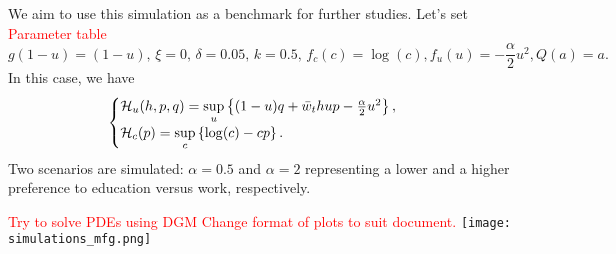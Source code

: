         We aim to use this simulation as a benchmark for further studies.        
        Let's set \textcolor{red}{Parameter table}
        $$g(1- u) = (1 - u),\,\xi = 0,\, \delta = 0.05, \, k = 0.5,\, f_c(c) = \log(c), f_u(u) = -\frac{\alpha}{2} u^2, Q(a) = a.$$        
        In this case, we have 
        \begin{equation}
            \begin{cases}    
            \mathcal{H}_u(h,p,q) = \sup\limits_{u} \left\{ (1 - u)q + \bar w_t h u p - \frac{\alpha}{2} u^2 \right\},\\
            \mathcal{H}_c (p) = \sup\limits_{c} \left\{ \log(c) - cp \right\}.
            \end{cases}
        \end{equation} 
        Two scenarios are simulated: $\alpha = 0.5$ and  $\alpha = 2$ representing a lower and a higher preference to education versus work, respectively.

        \textcolor{red}{Try to solve PDEs using DGM}
        \textcolor{red}{Change format of plots to suit document.}
        \texttt{[image: simulations\_mfg.png]}